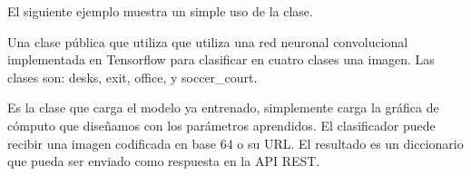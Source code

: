 El siguiente ejemplo
muestra un simple uso de la clase.

%
%

\begin{sphinxVerbatim}[commandchars=\\\{\}]
   
  
  
\end{sphinxVerbatim}



Una clase pública que utiliza que utiliza una red neuronal
convolucional implementada en Tensorflow para clasificar en cuatro
clases una imagen. Las clases son:
desks,
exit,
office,
y soccer\_court.

Es la clase que carga el modelo ya entrenado, simplemente carga
la gráfica de cómputo que diseñamos con los parámetros
aprendidos. El clasificador puede
recibir una imagen codificada en base 64 o su URL. El resultado
es un diccionario que pueda ser enviado como respuesta en la API
REST.

